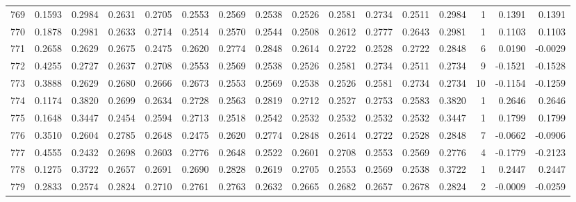 \begin{tabular}{lrrrrrrrrrrrrrrr}
769 &      0.1593 &  0.2984 &  0.2631 &  0.2705 &  0.2553 &  0.2569 &  0.2538 &  0.2526 &  0.2581 &  0.2734 &   0.2511 &     0.2984 &      1 &                    0.1391 &                     0.1391 \\
770 &      0.1878 &  0.2981 &  0.2633 &  0.2714 &  0.2514 &  0.2570 &  0.2544 &  0.2508 &  0.2612 &  0.2777 &   0.2643 &     0.2981 &      1 &                    0.1103 &                     0.1103 \\
771 &      0.2658 &  0.2629 &  0.2675 &  0.2475 &  0.2620 &  0.2774 &  0.2848 &  0.2614 &  0.2722 &  0.2528 &   0.2722 &     0.2848 &      6 &                    0.0190 &                    -0.0029 \\
772 &      0.4255 &  0.2727 &  0.2637 &  0.2708 &  0.2553 &  0.2569 &  0.2538 &  0.2526 &  0.2581 &  0.2734 &   0.2511 &     0.2734 &      9 &                   -0.1521 &                    -0.1528 \\
773 &      0.3888 &  0.2629 &  0.2680 &  0.2666 &  0.2673 &  0.2553 &  0.2569 &  0.2538 &  0.2526 &  0.2581 &   0.2734 &     0.2734 &     10 &                   -0.1154 &                    -0.1259 \\
774 &      0.1174 &  0.3820 &  0.2699 &  0.2634 &  0.2728 &  0.2563 &  0.2819 &  0.2712 &  0.2527 &  0.2753 &   0.2583 &     0.3820 &      1 &                    0.2646 &                     0.2646 \\
775 &      0.1648 &  0.3447 &  0.2454 &  0.2594 &  0.2713 &  0.2518 &  0.2542 &  0.2532 &  0.2532 &  0.2532 &   0.2532 &     0.3447 &      1 &                    0.1799 &                     0.1799 \\
776 &      0.3510 &  0.2604 &  0.2785 &  0.2648 &  0.2475 &  0.2620 &  0.2774 &  0.2848 &  0.2614 &  0.2722 &   0.2528 &     0.2848 &      7 &                   -0.0662 &                    -0.0906 \\
777 &      0.4555 &  0.2432 &  0.2698 &  0.2603 &  0.2776 &  0.2648 &  0.2522 &  0.2601 &  0.2708 &  0.2553 &   0.2569 &     0.2776 &      4 &                   -0.1779 &                    -0.2123 \\
778 &      0.1275 &  0.3722 &  0.2657 &  0.2691 &  0.2690 &  0.2828 &  0.2619 &  0.2705 &  0.2553 &  0.2569 &   0.2538 &     0.3722 &      1 &                    0.2447 &                     0.2447 \\
779 &      0.2833 &  0.2574 &  0.2824 &  0.2710 &  0.2761 &  0.2763 &  0.2632 &  0.2665 &  0.2682 &  0.2657 &   0.2678 &     0.2824 &      2 &                   -0.0009 &                    -0.0259 \\

\end{tabular}
